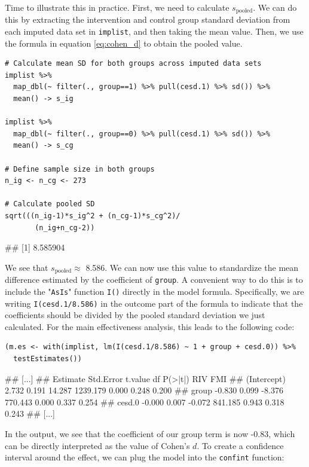 Time to illustrate this in practice. First, we need to calculate $s_{\text{pooled}}$. We can do this by extracting the intervention and control group standard deviation from each imputed data set in \texttt{implist}, and then taking the mean value. Then, we use the formula in equation \ref{eq:cohen_d} to obtain the pooled value. 

\begin{lstlisting}
# Calculate mean SD for both groups across imputed data sets
implist %>% 
  map_dbl(~ filter(., group==1) %>% pull(cesd.1) %>% sd()) %>% 
  mean() -> s_ig

implist %>% 
  map_dbl(~ filter(., group==0) %>% pull(cesd.1) %>% sd()) %>% 
  mean() -> s_cg

# Define sample size in both groups
n_ig <- n_cg <- 273

# Calculate pooled SD
sqrt(((n_ig-1)*s_ig^2 + (n_cg-1)*s_cg^2)/
       (n_ig+n_cg-2))
\end{lstlisting}

\begin{example}
## [1] 8.585904
\end{example}

We see that $s_{\text{pooled}}\approx$ 8.586. We can now use this value to standardize the mean difference estimated by the coefficient of \texttt{group}. A convenient way to do this is to include the "\texttt{AsIs}" function \texttt{I()} directly in the model formula. Specifically, we are writing \texttt{I(cesd.1/8.586)} in the outcome part of the formula to indicate that the coefficients should be divided by the pooled standard deviation we just calculated. For the main effectiveness analysis, this leads to the following code:

\begin{lstlisting}
(m.es <- with(implist, lm(I(cesd.1/8.586) ~ 1 + group + cesd.0)) %>%
  testEstimates())
\end{lstlisting}

\begin{example}
## [...]
##              Estimate Std.Error t.value       df P(>|t|)   RIV   FMI 
## (Intercept)     2.732     0.191  14.287 1239.179   0.000 0.248 0.200 
## group          -0.830     0.099  -8.376  770.443   0.000 0.337 0.254 
## cesd.0         -0.000     0.007  -0.072  841.185   0.943 0.318 0.243
## [...]
\end{example}

In the output, we see that the coefficient of our group term is now -0.83, which can be directly interpreted as the value of Cohen's $d$. To create a confidence interval around the effect, we can plug the model into the \texttt{confint} function:


